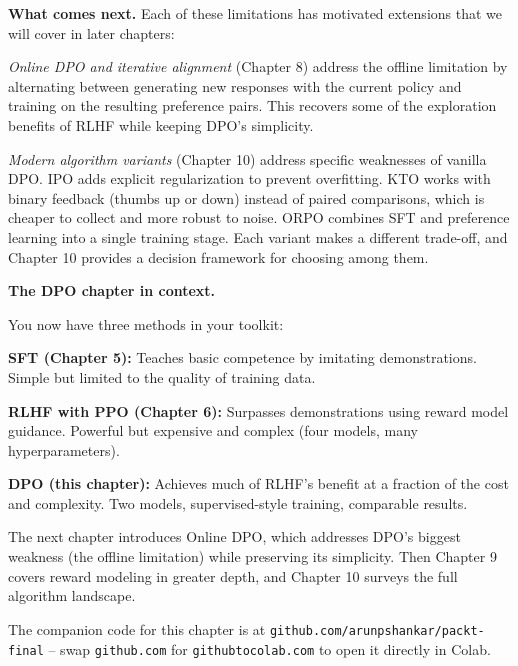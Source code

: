 \begin{chapterenv}
\textbf{What comes next.} Each of these limitations has motivated extensions that we will cover in later chapters:

\textit{Online DPO and iterative alignment} (Chapter 8) address the offline limitation by alternating between generating new responses with the current policy and training on the resulting preference pairs. This recovers some of the exploration benefits of RLHF while keeping DPO's simplicity.

\textit{Modern algorithm variants} (Chapter 10) address specific weaknesses of vanilla DPO. IPO adds explicit regularization to prevent overfitting. KTO works with binary feedback (thumbs up or down) instead of paired comparisons, which is cheaper to collect and more robust to noise. ORPO combines SFT and preference learning into a single training stage. Each variant makes a different trade-off, and Chapter 10 provides a decision framework for choosing among them.

\begin{infobox}
\textbf{The DPO chapter in context.}

You now have three methods in your toolkit:

\textbf{SFT (Chapter 5):} Teaches basic competence by imitating demonstrations. Simple but limited to the quality of training data.

\textbf{RLHF with PPO (Chapter 6):} Surpasses demonstrations using reward model guidance. Powerful but expensive and complex (four models, many hyperparameters).

\textbf{DPO (this chapter):} Achieves much of RLHF's benefit at a fraction of the cost and complexity. Two models, supervised-style training, comparable results.

The next chapter introduces Online DPO, which addresses DPO's biggest weakness (the offline limitation) while preserving its simplicity. Then Chapter 9 covers reward modeling in greater depth, and Chapter 10 surveys the full algorithm landscape.
\end{infobox}


The companion code for this chapter is at \texttt{github.com/arunpshankar/packt-final} -- swap \texttt{github.com} for \texttt{githubtocolab.com} to open it directly in Colab.

\end{chapterenv}